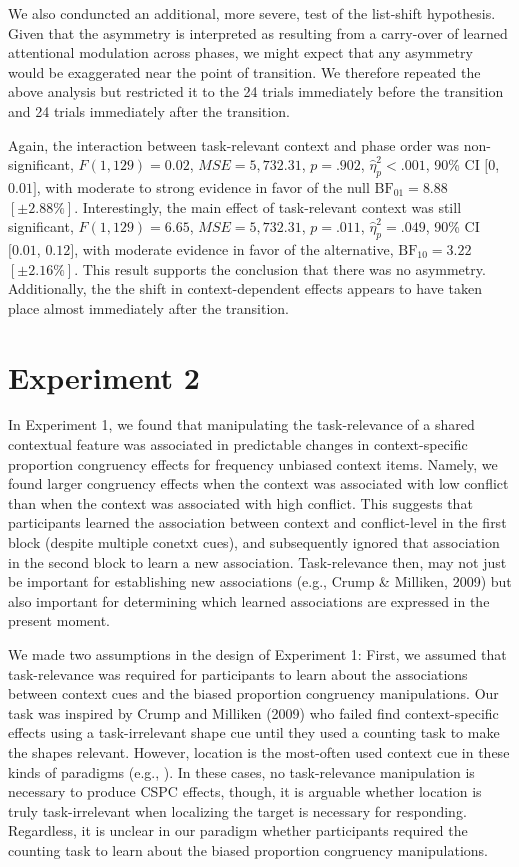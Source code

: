 \documentclass[english,,man,floatsintext]{apa6}
\begin{document}
We also conduncted an additional, more severe, test of the list-shift hypothesis. Given that the asymmetry is interpreted as resulting from a carry-over of learned attentional modulation across phases, we might expect that any asymmetry would be exaggerated near the point of transition. We therefore repeated the above analysis but restricted it to the 24 trials immediately before the transition and 24 trials immediately after the transition.

Again, the interaction between task-relevant context and phase order was non-significant, \(F(1, 129) = 0.02\), \(\mathit{MSE} = 5,732.31\), \(p = .902\), \(\hat{\eta}^2_p < .001\), 90\% CI \([0\), \(0.01]\), with moderate to strong evidence in favor of the null \(\mathrm{BF}_{\textrm{01}} = 8.88\) \([\pm 2.88\%]\). Interestingly, the main effect of task-relevant context was still significant, \(F(1, 129) = 6.65\), \(\mathit{MSE} = 5,732.31\), \(p = .011\), \(\hat{\eta}^2_p = .049\), 90\% CI \([0.01\), \(0.12]\), with moderate evidence in favor of the alternative, \(\mathrm{BF}_{\textrm{10}} = 3.22\) \([\pm 2.16\%]\). This result supports the conclusion that there was no asymmetry. Additionally, the the shift in context-dependent effects appears to have taken place almost immediately after the transition.

\hypertarget{experiment-2}{%
\section{Experiment 2}\label{experiment-2}}

In Experiment 1, we found that manipulating the task-relevance of a shared contextual feature was associated in predictable changes in context-specific proportion congruency effects for frequency unbiased context items. Namely, we found larger congruency effects when the context was associated with low conflict than when the context was associated with high conflict. This suggests that participants learned the association between context and conflict-level in the first block (despite multiple conetxt cues), and subsequently ignored that association in the second block to learn a new association. Task-relevance then, may not just be important for establishing new associations (e.g., Crump \& Milliken, 2009) but also important for determining which learned associations are expressed in the present moment.

We made two assumptions in the design of Experiment 1: First, we assumed that task-relevance was required for participants to learn about the associations between context cues and the biased proportion congruency manipulations. Our task was inspired by Crump and Milliken (2009) who failed find context-specific effects using a task-irrelevant shape cue until they used a counting task to make the shapes relevant. However, location is the most-often used context cue in these kinds of paradigms (e.g., ). In these cases, no task-relevance manipulation is necessary to produce CSPC effects, though, it is arguable whether location is truly task-irrelevant when localizing the target is necessary for responding. Regardless, it is unclear in our paradigm whether participants required the counting task to learn about the biased proportion congruency manipulations.
\end{document}
